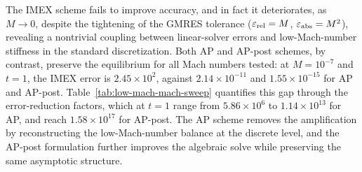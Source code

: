 \documentclass[pdflatex,final,10pt]{article}
\newcommand{\Fabrice}[1]{#1}
\begin{document}
\Fabrice{The IMEX scheme fails to improve accuracy, and in fact it deteriorates, as $M \to 0$, despite the tightening of the GMRES tolerance ($\varepsilon_{\rm rel}=M$, $\varepsilon_{\rm abs}=M^2$), revealing a nontrivial coupling between linear-solver errors and low-Mach-number stiffness in the standard discretization. Both AP and AP-post schemes, by contrast, preserve the equilibrium for all Mach numbers tested: at $M=10^{-7}$ and $t=1$, the IMEX error is $2.45\times10^2$, against $2.14\times10^{-11}$ and $1.55\times10^{-15}$
for AP and AP-post. Table~\ref{tab:low-mach-mach-sweep} quantifies this gap
through the error-reduction factors, which at $t=1$ range from $5.86\times10^6$
to $1.14\times10^{13}$ for AP, and reach $1.58\times10^{17}$ for AP-post. The AP
scheme removes the amplification by reconstructing the low-Mach-number balance
at the discrete level, and the AP-post formulation further improves the
algebraic solve while preserving the same asymptotic structure.}


\end{document}
